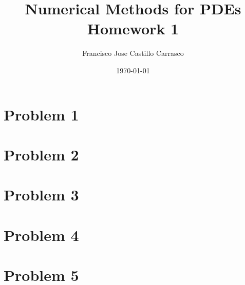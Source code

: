 




\title{Numerical Methods for PDEs\\Homework 1}
\author{Francisco Jose Castillo Carrasco}
\date{\today}
\maketitle




\section*{Problem 1}


\section*{Problem 2}


\section*{Problem 3}


\section*{Problem 4}


\section*{Problem 5}



